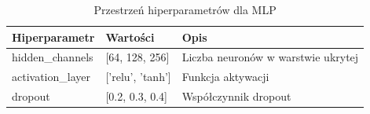 \begin{table}[h]
\centering
\caption{Przestrzeń hiperparametrów dla MLP}
\label{tab:hyperparams_mlp}
\begin{tabular}{lll}
\toprule
Hiperparametr & Wartości & Opis \\
\midrule
hidden\_channels & [64, 128, 256] & Liczba neuronów w warstwie ukrytej \\
activation\_layer & ['relu', 'tanh'] & Funkcja aktywacji \\
dropout & [0.2, 0.3, 0.4] & Współczynnik dropout \\
\bottomrule
\end{tabular}
\end{table}
